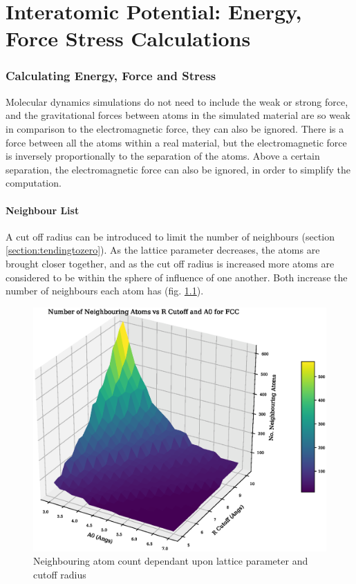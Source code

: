 \chapter[EFS Calculations]{Interatomic Potential: Energy, Force Stress Calculations}
\label{chap:appendix-activity-v2}

\FloatBarrier
\subsection{Calculating Energy, Force and Stress}
\label{section:backgroundenergyforcestress}

Molecular dynamics simulations do not need to include the weak or strong force, and the gravitational forces between atoms in the simulated material are so weak in comparison to the electromagnetic force, they can also be ignored.  There is a force between all the atoms within a real material, but the electromagnetic force is inversely proportionally to the separation of the atoms.  Above a certain separation, the electromagnetic force can also be ignored, in order to simplify the computation.

\FloatBarrier
\subsubsection{Neighbour List}
\label{section:neighbourlist}

A cut off radius can be introduced to limit the number of neighbours (section \ref{section:tendingtozero}).  As the lattice parameter decreases, the atoms are brought closer together, and as the cut off radius is increased more atoms are considered to be within the sphere of influence of one another.  Both increase the number of neighbours each atom has (fig. \ref{fig:nlsize}).

\begin{figure}[tbp]
  \begin{center}
    \includegraphics[scale=0.40]{chapters/interatomic_potential_fitting/plots/atom_neighbours.eps}
    \caption{Neighbouring atom count dependant upon lattice parameter and cutoff radius}
    \label{fig:nlsize}
  \end{center}
\end{figure}

